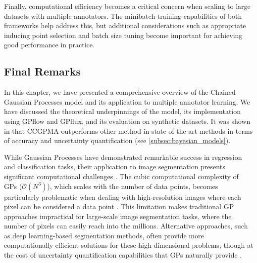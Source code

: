 Finally, computational efficiency becomes a critical concern when
scaling to large datasets with multiple annotators. The minibatch
training capabilities of both frameworks help address this, but
additional considerations such as appropriate inducing point
selection and batch size tuning become important for achieving good
performance in practice.

\subsection{Final Remarks}

In this chapter, we have presented a comprehensive overview of the
Chained Gaussian Processes model and its application to multiple
annotator learning. We have discussed the theoretical underpinnings of
the model, its implementation using GPflow and GPflux, and its
evaluation on synthetic datasets. It was shown in
\cite{GilGonzalezEtAl2023} that \gls{CCGPMA} outperforms other method
in state of the art methods in terms of accuracy and uncertainty
quantification (see \ref{subsec:bayesian_models}).

While Gaussian Processes have demonstrated remarkable success in
regression and classification tasks, their application to image
segmentation presents significant computational challenges
\cite{RasmussenEtAl2006Chapter9}. The cubic
computational complexity of GPs ($\mathcal{O}(N^3)$), which scales with
the number of data points, becomes particularly problematic when
dealing with high-resolution images where each pixel can be considered
a data point \cite{LiuEtAl2020}.
This limitation makes traditional GP approaches
impractical for large-scale image segmentation tasks, where the number
of pixels can easily reach into the millions. Alternative approaches,
such as deep learning-based segmentation methods, often provide more
computationally efficient solutions for these high-dimensional
problems, though at the cost of uncertainty quantification
capabilities that GPs naturally provide \cite{KendallEtAl2017}
\cite{WilsonEtAl2016}.
